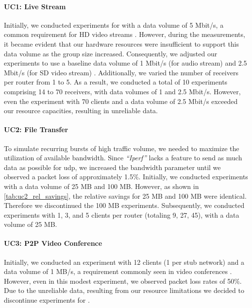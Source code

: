 \paragraph{UC1: Live Stream} %
\label{par:UC1}
Initially, we conducted experiments for \uci{} with a data volume of 5 Mbit/s,
    a common requirement for HD video streams \cite{cartesian_us_bw}.
However, during the measurements, it became evident that our hardware resources
    were insufficient to support this data volume as the group size increased.
Consequently, we adjusted our experiments to use a baseline data volume of 1
    Mbit/s (for audio stream) and 2.5 Mbit/s (for SD video stream)
    \cite{cartesian_us_bw}.
Additionally, we varied the number of receivers per router from 1 to 5.
As a result, we conducted a  total of 10 experiments comprising 14 to 70
    receivers, with data volumes of 1 and 2.5 Mbit/s.
However, even the experiment with 70 clients and a data volume of 2.5 Mbit/s 
    exceeded our resource capacities, resulting in unreliable data.

\paragraph{UC2: File Transfer} %
\label{par:UC2}
To simulate recurring bursts of high traffic volume, we needed to maximize the
    utilization of available bandwidth.
Since \textit{``Iperf''} lacks a feature to send as much data as possible for
    \gls{udp}, we increased the bandwidth parameter until we observed a packet
    loss of approximately 1.5\%.
Initially, we conducted experiments with a data volume of 25 MB and 100 MB.
However, as shown in \autoref{tab:uc2_rel_savings}, the relative savings for 
    25 MB and 100 MB were identical.
Therefore we discontinued the 100 MB experiments.
Subsequently, we conducted experiments with 1, 3, and 5 clients per router
    (totaling 9, 27, 45), with a data volume of 25 MB.

\paragraph{UC3: P2P Video Conference} %
\label{par:UC3}
Initially, we conducted an experiment with 12 clients (1 per stub network) and
    a data volume of 1 MB/s, a requirement commonly seen in video conferences
    \cite{cartesian_us_bw}.
However, even in this modest experiment, we observed packet loss rates of
    50\%.
Due to the unreliable data, resulting from our resource limitations we decided
    to discontinue experiments for \uciii{}.

